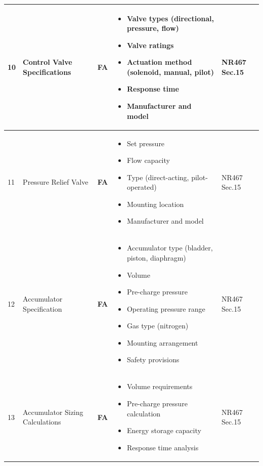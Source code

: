\documentclass[11pt,a4paper]{report}
\newcommand{\fa}{\textbf{\textcolor{warningred}{FA}}}
\begin{document}
\begin{longtable}{|p{0.5cm}|p{5cm}|p{1.5cm}|p{5.5cm}|p{2cm}|}
10 & Control Valve Specifications & \fa{} & 
\begin{itemize}[leftmargin=*,nosep]
\item Valve types (directional, pressure, flow)
\item Valve ratings
\item Actuation method (solenoid, manual, pilot)
\item Response time
\item Manufacturer and model
\end{itemize} & NR467 Sec.15 \\
\hline

11 & Pressure Relief Valve & \fa{} & 
\begin{itemize}[leftmargin=*,nosep]
\item Set pressure
\item Flow capacity
\item Type (direct-acting, pilot-operated)
\item Mounting location
\item Manufacturer and model
\end{itemize} & NR467 Sec.15 \\
\hline

12 & Accumulator Specification & \fa{} & 
\begin{itemize}[leftmargin=*,nosep]
\item Accumulator type (bladder, piston, diaphragm)
\item Volume
\item Pre-charge pressure
\item Operating pressure range
\item Gas type (nitrogen)
\item Mounting arrangement
\item Safety provisions
\end{itemize} & NR467 Sec.15 \\
\hline

13 & Accumulator Sizing Calculations & \fa{} & 
\begin{itemize}[leftmargin=*,nosep]
\item Volume requirements
\item Pre-charge pressure calculation
\item Energy storage capacity
\item Response time analysis
\end{itemize} & NR467 Sec.15 \\
\hline

\end{longtable}
\end{document}
